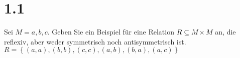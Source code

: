 \documentclass[11pt]{article}
\begin{document}
    \section{1.1}\label{sec:1.1}
    Sei $M={a,b,c}$.
    Geben Sie ein Beispiel für eine Relation $R\subseteq M\times M$ an, die reflexiv, aber weder symmetrisch noch antisymmetrisch ist.\\
    $R=\left\{(a,a),(b,b),(c,c),(a,b),(b,a),(a,c)\right\}$
\end{document}
